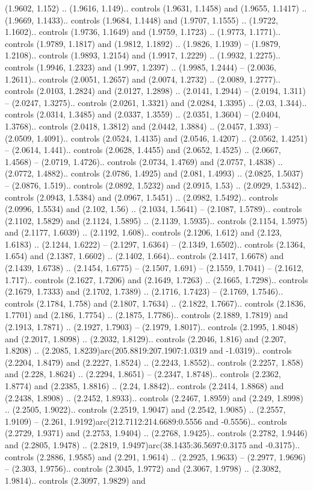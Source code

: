 (1.9602, 1.152) .. (1.9616, 1.149).. controls (1.9631, 1.1458) and (1.9655, 1.1417) .. (1.9669, 1.1433).. controls (1.9684, 1.1448) and (1.9707, 1.1555) .. (1.9722, 1.1602).. controls (1.9736, 1.1649) and (1.9759, 1.1723) .. (1.9773, 1.1771).. controls (1.9789, 1.1817) and (1.9812, 1.1892) .. (1.9826, 1.1939) -- (1.9879, 1.2108).. controls (1.9893, 1.2154) and (1.9917, 1.2229) .. (1.9932, 1.2275).. controls (1.9946, 1.2323) and (1.997, 1.2397) .. (1.9985, 1.2444) -- (2.0036, 1.2611).. controls (2.0051, 1.2657) and (2.0074, 1.2732) .. (2.0089, 1.2777).. controls (2.0103, 1.2824) and (2.0127, 1.2898) .. (2.0141, 1.2944) -- (2.0194, 1.311) -- (2.0247, 1.3275).. controls (2.0261, 1.3321) and (2.0284, 1.3395) .. (2.03, 1.344).. controls (2.0314, 1.3485) and (2.0337, 1.3559) .. (2.0351, 1.3604) -- (2.0404, 1.3768).. controls (2.0418, 1.3812) and (2.0442, 1.3884) .. (2.0457, 1.393) -- (2.0509, 1.4091).. controls (2.0524, 1.4135) and (2.0546, 1.4207) .. (2.0562, 1.4251) -- (2.0614, 1.441).. controls (2.0628, 1.4455) and (2.0652, 1.4525) .. (2.0667, 1.4568) -- (2.0719, 1.4726).. controls (2.0734, 1.4769) and (2.0757, 1.4838) .. (2.0772, 1.4882).. controls (2.0786, 1.4925) and (2.081, 1.4993) .. (2.0825, 1.5037) -- (2.0876, 1.519).. controls (2.0892, 1.5232) and (2.0915, 1.53) .. (2.0929, 1.5342).. controls (2.0943, 1.5384) and (2.0967, 1.5451) .. (2.0982, 1.5492).. controls (2.0996, 1.5534) and (2.102, 1.56) .. (2.1034, 1.5641) -- (2.1087, 1.5789).. controls (2.1102, 1.5829) and (2.1124, 1.5895) .. (2.1139, 1.5935).. controls (2.1154, 1.5975) and (2.1177, 1.6039) .. (2.1192, 1.608).. controls (2.1206, 1.612) and (2.123, 1.6183) .. (2.1244, 1.6222) -- (2.1297, 1.6364) -- (2.1349, 1.6502).. controls (2.1364, 1.654) and (2.1387, 1.6602) .. (2.1402, 1.664).. controls (2.1417, 1.6678) and (2.1439, 1.6738) .. (2.1454, 1.6775) -- (2.1507, 1.691) -- (2.1559, 1.7041) -- (2.1612, 1.717).. controls (2.1627, 1.7206) and (2.1649, 1.7263) .. (2.1665, 1.7298).. controls (2.1679, 1.7333) and (2.1702, 1.7389) .. (2.1716, 1.7423) -- (2.1769, 1.7546).. controls (2.1784, 1.758) and (2.1807, 1.7634) .. (2.1822, 1.7667).. controls (2.1836, 1.7701) and (2.186, 1.7754) .. (2.1875, 1.7786).. controls (2.1889, 1.7819) and (2.1913, 1.7871) .. (2.1927, 1.7903) -- (2.1979, 1.8017).. controls (2.1995, 1.8048) and (2.2017, 1.8098) .. (2.2032, 1.8129).. controls (2.2046, 1.816) and (2.207, 1.8208) .. (2.2085, 1.8239)arc(205.8819:207.1907:1.0319 and -1.0319).. controls (2.2204, 1.8479) and (2.2227, 1.8524) .. (2.2243, 1.8552).. controls (2.2257, 1.858) and (2.228, 1.8624) .. (2.2294, 1.8651) -- (2.2347, 1.8748).. controls (2.2362, 1.8774) and (2.2385, 1.8816) .. (2.24, 1.8842).. controls (2.2414, 1.8868) and (2.2438, 1.8908) .. (2.2452, 1.8933).. controls (2.2467, 1.8959) and (2.249, 1.8998) .. (2.2505, 1.9022).. controls (2.2519, 1.9047) and (2.2542, 1.9085) .. (2.2557, 1.9109) -- (2.261, 1.9192)arc(212.7112:214.6689:0.5556 and -0.5556).. controls (2.2729, 1.9371) and (2.2753, 1.9404) .. (2.2768, 1.9425).. controls (2.2782, 1.9446) and (2.2805, 1.9478) .. (2.2819, 1.9497)arc(38.1435:36.5697:0.3175 and -0.3175).. controls (2.2886, 1.9585) and (2.291, 1.9614) .. (2.2925, 1.9633) -- (2.2977, 1.9696) -- (2.303, 1.9756).. controls (2.3045, 1.9772) and (2.3067, 1.9798) .. (2.3082, 1.9814).. controls (2.3097, 1.9829) and 